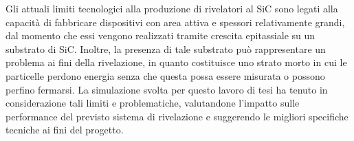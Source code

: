 Gli attuali limiti tecnologici alla produzione di rivelatori al SiC sono legati alla capacità di fabbricare dispositivi con area attiva e spessori relativamente grandi, dal momento che essi vengono realizzati tramite crescita epitassiale su un substrato di SiC.
Inoltre, la presenza di tale substrato può rappresentare un problema ai fini della rivelazione, in quanto costituisce uno strato morto in cui le particelle perdono energia senza che questa possa essere misurata o possono perfino fermarsi.
La simulazione svolta per questo lavoro di tesi ha tenuto in considerazione tali limiti e problematiche, valutandone l'impatto sulle performance del previsto sistema di rivelazione e suggerendo le migliori specifiche tecniche ai fini del progetto. 














\subsection{}






